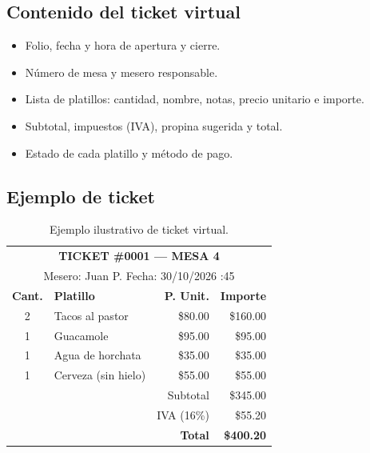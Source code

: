 \documentclass[11pt,letterpaper]{article}
\newcommand{\tabhead}[1]{\textbf{\color{white}#1}}
\newcommand{\encabezado}{\rowcolor{azulprincipal}}
\begin{document}
\subsection{Contenido del ticket virtual}
\begin{itemize}[noitemsep]
  \item Folio, fecha y hora de apertura y cierre.
  \item Número de mesa y mesero responsable.
  \item Lista de platillos: cantidad, nombre, notas, precio unitario e importe.
  \item Subtotal, impuestos (IVA), propina sugerida y total.
  \item Estado de cada platillo y método de pago.
\end{itemize}

\subsection{Ejemplo de ticket}
\begin{table}[h!]
\centering
\begin{tabular}{@{}clrr@{}}
\multicolumn{4}{c}{\textbf{TICKET \#0001 --- MESA 4}}\\
\multicolumn{4}{c}{\small Mesero: Juan P. \quad Fecha: 30/10/2026 \quad 16:45}\\
\toprule
\encabezado \tabhead{Cant.} & \tabhead{Platillo} & \tabhead{P. Unit.} & \tabhead{Importe} \\
\midrule
2 & Tacos al pastor & \$80.00 & \$160.00 \\
1 & Guacamole & \$95.00 & \$95.00 \\
1 & Agua de horchata & \$35.00 & \$35.00 \\
1 & Cerveza (sin hielo) & \$55.00 & \$55.00 \\
\midrule
 & & Subtotal & \$345.00 \\
 & & IVA (16\%) & \$55.20 \\
 & & \textbf{Total} & \textbf{\$400.20} \\
\bottomrule
\end{tabular}
\caption{Ejemplo ilustrativo de ticket virtual.}
\end{table}

\end{document}
